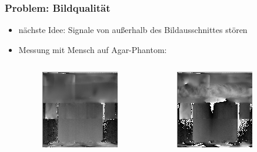 \documentclass{beamer}
\begin{document}
    \begin{frame}
        \frametitle{Problem: Bildqualität}
        \begin{itemize}
            \item
                nächste Idee: Signale von außerhalb des Bildausschnittes stören
            \item 
                Messung mit Mensch auf Agar-Phantom:
                \begin{columns}
                    \begin{figure}
                        \centering
                        \includegraphics[width=.8\textwidth]{../Abbildungen/2014-12-11_27_1_phase_nous_mensch.png}
                    \end{figure}
                    \begin{figure}
                        \centering
                        \includegraphics[width=.8\textwidth]{../Abbildungen/2014-12-11_29_1_phase_us_mensch.png}
                    \end{figure}
                \end{columns}
        \end{itemize}
    \end{frame}
\end{document}

